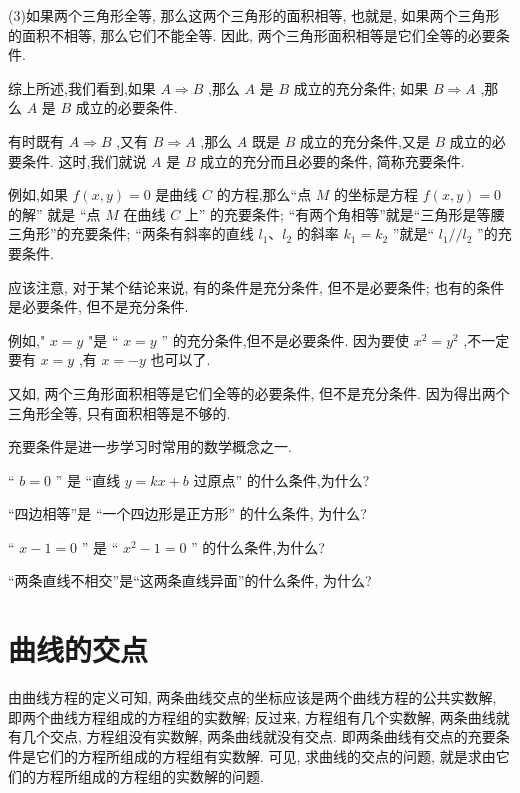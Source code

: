 \documentclass[lang=cn,newtx,12pt,scheme=chinese]{elegantbook}
\begin{document}
(3)如果两个三角形全等, 那么这两个三角形的面积相等, 也就是, 如果两个三角形的面积不相等, 那么它们不能全等. 因此, 两个三角形面积相等是它们全等的必要条件.

综上所述,我们看到,如果 \(A \Rightarrow B\) ,那么 \(A\) 是 \(B\) 成立的充分条件; 如果 \(B \Rightarrow A\) ,那么 \(A\) 是 \(B\) 成立的必要条件.
\begin{definition}[充要条件]
  有时既有 \(A \Rightarrow B\) ,又有 \(B \Rightarrow A\) ,那么 \(A\) 既是 \(B\) 成立的充分条件,又是 \(B\) 成立的必要条件. 这时,我们就说 \(A\) 是 \(B\) 成立的充分而且必要的条件, 简称充要条件.
\end{definition}
例如,如果 \(f\left( {x,y}\right) = 0\) 是曲线 \(C\) 的方程,那么“点 \(M\) 的坐标是方程 \(f\left( {x,y}\right) = 0\) 的解” 就是 “点 \(M\) 在曲线 \(C\) 上” 的充要条件; “有两个角相等”就是“三角形是等腰三角形”的充要条件; “两条有斜率的直线 \({l}_{1}\text{、}{l}_{2}\) 的斜率 \({k}_{1} = {k}_{2}\) ”就是“ \({l}_{1}//{l}_{2}\) ”的充要条件.

应该注意, 对于某个结论来说, 有的条件是充分条件, 但不是必要条件; 也有的条件是必要条件, 但不是充分条件.

例如," \(x = y\) "是 “ \(x = y\) ” 的充分条件,但不是必要条件. 因为要使 \({x}^{2} = {y}^{2}\) ,不一定要有 \(x = y\) ,有 \(x = - y\) 也可以了.

又如, 两个三角形面积相等是它们全等的必要条件, 但不是充分条件. 因为得出两个三角形全等, 只有面积相等是不够的.

充要条件是进一步学习时常用的数学概念之一.

\begin{problemset}[练习]

\item “ \(b = 0\) ” 是 “直线 \(y = {kx} + b\) 过原点” 的什么条件,为什么?

\item “四边相等”是 “一个四边形是正方形” 的什么条件, 为什么?

\item “ \(x - 1 = 0\) ” 是 “ \({x}^{2} - 1 = 0\) ” 的什么条件,为什么?

\item “两条直线不相交”是“这两条直线异面”的什么条件, 为什么?
\end{problemset}

\section{曲线的交点}

由曲线方程的定义可知, 两条曲线交点的坐标应该是两个曲线方程的公共实数解, 即两个曲线方程组成的方程组的实数解; 反过来, 方程组有几个实数解, 两条曲线就有几个交点, 方程组没有实数解, 两条曲线就没有交点. 即两条曲线有交点的充要条件是它们的方程所组成的方程组有实数解. 可见, 求曲线的交点的问题, 就是求由它们的方程所组成的方程组的实数解的问题.
\end{document}
